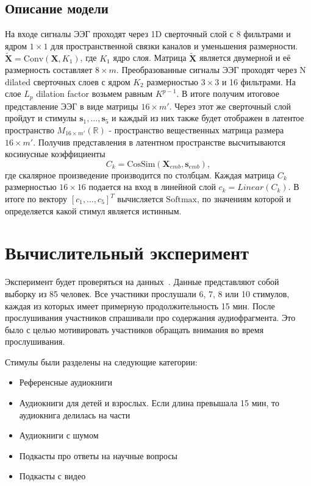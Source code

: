 \documentclass{article}
\begin{document}
\subsection{Описание модели}
    На входе сигналы ЭЭГ проходят через 1D сверточный слой с 8 фильтрами и ядром $1 \times 1$ для пространственной связки каналов и уменьшения размерности. $\tilde{\mathbf{X}} = \mathrm{Conv}(\mathbf{X}, K_1)$, где $K_1$ ядро слоя. Матрица $\tilde{\mathbf{X}}$ является двумерной и её размерность составляет $8 \times m$. Преобразованные сигналы ЭЭГ проходят через N dilated сверточных слоев с ядром $K_2$ размерностью $3 \times 3$ и 16 фильтрами. На слое $L_p$ dilation factor возьмем равным $K^{p-1}$. В итоге получим итоговое представление ЭЭГ в виде матрицы $16 \times m'$. Через этот же сверточный слой пройдут и стимулы $\mathbf{s}_1, \dots, \mathbf{s}_5$ и каждый из них также будет отображен в латентое пространство $M_{16\times m'}(\mathbb{R})$ - пространство вещественных матрица размера $16 \times m'$. Получив представления в латентном пространстве высчитываются косинусные коэффициенты $$C_k = \mathrm{CosSim}(\mathbf{X}_{emb}, \mathbf{s}_{emb}),$$ 
    где скалярное произведение производится по столбцам. Каждая матрица $C_k$ размерностью $16 \times 16$ подается на вход в линейной слой $c_k = Linear(C_k)$. В итоге по вектору $[c_1, \dots, c_5]^T$ вычисляется $\mathrm{Softmax}$, по значениям которой и определяется какой стимул является истинным. 

\section{Вычислительный эксперимент}
    Эксперимент будет проверяться на данных~\citep{K3VSND_2023}. Данные представляют собой выборку из 85 человек. Все участники прослушали 6, 7, 8 или 10 стимулов, каждая из которых имеет примерную продолжительность 15 мин. После прослушивания участников спрашивали про содержания аудиофрагмента. Это было с целью мотивировать участников обращать внимания во время прослушивания.

    Стимулы были разделены на следующие категории:

    \begin{itemize}
        \item Референсные аудиокниги
        \item Аудиокниги для детей и взрослых. Если длина превышала 15 мин, то аудиокнига делилась на части
        \item Аудиокниги с шумом
        \item Подкасты про ответы на научные вопросы
        \item Подкасты с видео
    \end{itemize}
\end{document}
